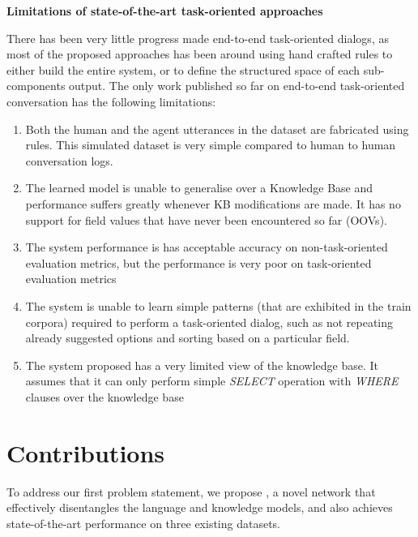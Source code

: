 \noindent \textbf{Limitations of state-of-the-art task-oriented approaches}

There has been very little progress made end-to-end task-oriented dialogs, as most of the proposed approaches has been around using hand crafted rules to either build the entire system, or to define the structured space of each sub-components output. The only work published so far on end-to-end task-oriented conversation has the following limitations:
\begin{enumerate}
\item Both the human and the agent utterances in the dataset are fabricated using rules. This simulated dataset is very simple compared to human to human conversation logs.
\item The learned model is unable to generalise over a Knowledge Base and performance suffers greatly whenever KB modifications are made. It has no support for field values that have never been encountered so far (OOVs).
\item The system performance is has acceptable accuracy on non-task-oriented evaluation metrics, but the performance is very poor on task-oriented evaluation metrics
\item The system is unable to learn simple patterns (that are exhibited in the train corpora) required to perform a task-oriented dialog, such as not repeating already suggested options and sorting based on a particular field.
\item The system proposed has a very limited view of the knowledge base. It assumes that it can only perform simple {\em SELECT} operation with {\em WHERE} clauses over the knowledge base
\end{enumerate} 

\section{Contributions}

To address our first problem statement, we propose \sys, a novel network that effectively disentangles the language and knowledge models, and also achieves state-of-the-art performance on three existing datasets. 

